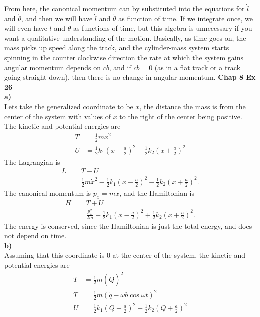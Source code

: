 \documentclass[10pt]{article}
\begin{document}
From here, the canonical momentum can by substituted into the equations for $\dot l$ and $\dot\theta$,
and then we will have $\dot l$ and $\dot\theta$ as function of time.  If we integrate once, we will
even have $l$ and $\theta$ as functions of time, but this algebra is unnecessary if you want a 
qualitative understanding of the motion.  Basically, as time goes on, the mass picks up speed along
the track, and the cylinder-mass system starts spinning in the counter clockwise direction the rate
at which the system gains angular momentum depends on $cb$, and if $cb=0$ (as in a flat track or a 
track going straight down), then there is no change in angular momentum.
\textbf{Chap 8 Ex 26}\\
\textbf{a)}\\
Lets take the generalized coordinate to be $x$, the distance the mass is from the center of the system
with values of $x$ to the right of the center being positive.  The kinetic and potential energies are
\begin{align*}
  T &= \frac{1}{2}m\dot x^2\\
  U &= \frac{1}{2}k_1\left( x-\frac{a}{2} \right)^2 + \frac{1}{2}k_2\left( x+\frac{a}{2} \right)^2
\end{align*}
The Lagrangian is
\begin{align*}
  L &= T - U\\
  &= \frac{1}{2}m\dot x^2 - \frac{1}{2}k_1\left( x-\frac{a}{2} \right)^2 - \frac{1}{2}k_2\left( x+\frac{a}{2} \right)^2.
\end{align*}
The canonical momentum is $p_x = m\dot x$, and the Hamiltonian is
\begin{align*}
  H &= T + U\\
  &= \frac{p_x^2}{2m} + \frac{1}{2}k_1\left( x-\frac{a}{2} \right)^2 + \frac{1}{2}k_2\left( x+\frac{a}{2} \right)^2.
\end{align*}
The energy is conserved, since the Hamiltonian is just the total energy, and does not depend on time.\\
\textbf{b)}\\
Assuming that this coordinate is 0 at the center of the system, the kinetic and potential energies are
\begin{align*}
  T &= \frac{1}{2}m\left( \dot Q \right)^2\\
  T &= \frac{1}{2}m\left( \dot q - \omega b\cos\omega t \right)^2\\
  U &= \frac{1}{2}k_1\left( Q-\frac{a}{2} \right)^2 + \frac{1}{2}k_2\left( Q+\frac{a}{2} \right)^2
\end{align*}
\end{document}
